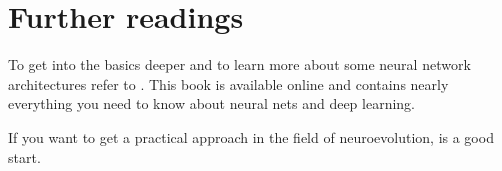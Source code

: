 \documentclass[jou,apacite]{apa6}
\begin{document}
\section{Further readings}
To get into the basics deeper and to learn more about some neural network architectures refer to \cite{Goodfellow-et-al-2016}. This book is available online and contains nearly everything you need to know about neural nets and deep learning.

If you want to get a practical approach in the field of neuroevolution, \cite{Sher2013} is a good start.

\printglossaries
\printindex

\end{document}
